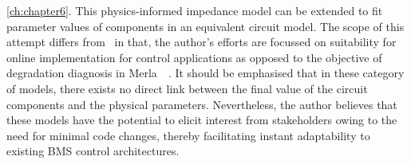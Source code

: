 \cref{ch:chapter6}. This physics-informed impedance model can be extended to fit parameter values of components in an
equivalent circuit model. The scope of this attempt differs from~\cite{Merla2018} in that, the author's efforts are
focussed on suitability for online implementation for control applications as opposed to the objective of degradation
diagnosis in Merla~\etal~\cite{Merla2018}. It should be emphasised that in these category of models, there exists no
direct link between the final value of the circuit components and the physical parameters. Nevertheless, the author
believes that these models have the potential to elicit interest from stakeholders owing to the need for minimal code
changes, thereby facilitating instant adaptability to existing BMS control architectures.











